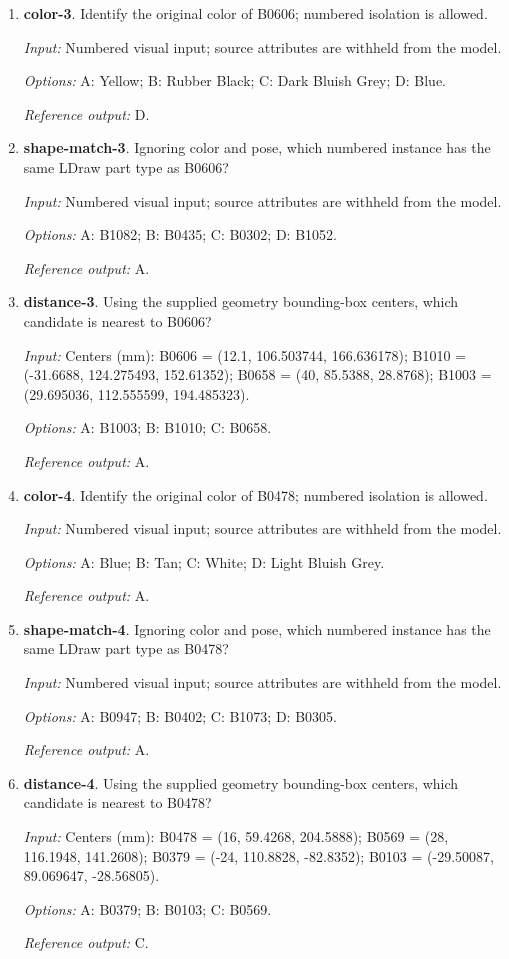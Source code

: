\begin{enumerate}
\item \textbf{color-3}. Identify the original color of B0606; numbered isolation is allowed.\par {\small \textit{Input:} Numbered visual input; source attributes are withheld from the model. \par\textit{Options:} A: Yellow; B: Rubber Black; C: Dark Bluish Grey; D: Blue. \par\textit{Reference output:} D.}
\item \textbf{shape-match-3}. Ignoring color and pose, which numbered instance has the same LDraw part type as B0606?\par {\small \textit{Input:} Numbered visual input; source attributes are withheld from the model. \par\textit{Options:} A: B1082; B: B0435; C: B0302; D: B1052. \par\textit{Reference output:} A.}
\item \textbf{distance-3}. Using the supplied geometry bounding-box centers, which candidate is nearest to B0606?\par {\small \textit{Input:} Centers (mm): B0606 = (12.1, 106.503744, 166.636178); B1010 = (-31.6688, 124.275493, 152.61352); B0658 = (40, 85.5388, 28.8768); B1003 = (29.695036, 112.555599, 194.485323). \par\textit{Options:} A: B1003; B: B1010; C: B0658. \par\textit{Reference output:} A.}
\item \textbf{color-4}. Identify the original color of B0478; numbered isolation is allowed.\par {\small \textit{Input:} Numbered visual input; source attributes are withheld from the model. \par\textit{Options:} A: Blue; B: Tan; C: White; D: Light Bluish Grey. \par\textit{Reference output:} A.}
\item \textbf{shape-match-4}. Ignoring color and pose, which numbered instance has the same LDraw part type as B0478?\par {\small \textit{Input:} Numbered visual input; source attributes are withheld from the model. \par\textit{Options:} A: B0947; B: B0402; C: B1073; D: B0305. \par\textit{Reference output:} A.}
\item \textbf{distance-4}. Using the supplied geometry bounding-box centers, which candidate is nearest to B0478?\par {\small \textit{Input:} Centers (mm): B0478 = (16, 59.4268, 204.5888); B0569 = (28, 116.1948, 141.2608); B0379 = (-24, 110.8828, -82.8352); B0103 = (-29.50087, 89.069647, -28.56805). \par\textit{Options:} A: B0379; B: B0103; C: B0569. \par\textit{Reference output:} C.}

\end{enumerate}
